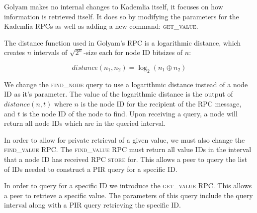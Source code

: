 Golyam makes no internal changes to Kademlia itself, it focuses on how information is retrieved itself. It does so by modifying the parameters for the Kademlia RPCs as well as adding a new command: \textsc{get\_value}.

The distance function used in Golyam's RPC is a logarithmic distance\cite{discv5}, which creates $n$ intervals of $\sqrt{2^n}$-size each for node ID bitsizes of $n$:

\[
distance(n_1, n_2) = \log_2(n_1 \oplus n_2)
\]

We change the \textsc{find\_node} query to use a logarithmic distance instead of a node ID as it's parameter. The value of the logarithmic distance is the output of $distance(n, t)$ where $n$ is the node ID for the recipient of the RPC message, and $t$ is the node ID of the node to find. Upon receiving a query, a node will return all node IDs which are in the queried interval.

In order to allow for private retrieval of a given value, we must also change the \textsc{find\_value} RPC. The \textsc{find\_value} RPC must return all value IDs in the interval that a node ID has received RPC \textsc{store} for. This allows a peer to query the list of IDs needed to construct a PIR query for a specific ID.

In order to query for a specific ID we introduce the \textsc{get\_value} RPC. This allows a peer to retrieve a specific value. The parameters of this query include the query interval along with a PIR query retrieving the specific ID.


